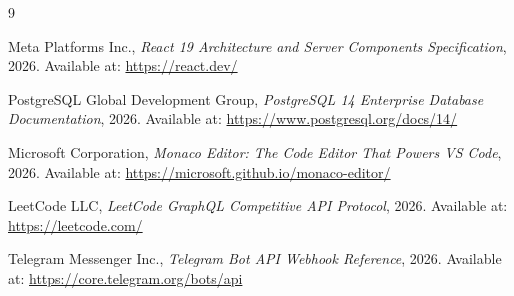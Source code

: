 \documentclass[12pt,a4paper]{report}
\begin{document}
\cleardoublepage
\begin{thebibliography}{9}

Meta Platforms Inc., \textit{React 19 Architecture and Server Components Specification}, 2026. Available at: \url{https://react.dev/}

PostgreSQL Global Development Group, \textit{PostgreSQL 14 Enterprise Database Documentation}, 2026. Available at: \url{https://www.postgresql.org/docs/14/}

Microsoft Corporation, \textit{Monaco Editor: The Code Editor That Powers VS Code}, 2026. Available at: \url{https://microsoft.github.io/monaco-editor/}

LeetCode LLC, \textit{LeetCode GraphQL Competitive API Protocol}, 2026. Available at: \url{https://leetcode.com/}

Telegram Messenger Inc., \textit{Telegram Bot API Webhook Reference}, 2026. Available at: \url{https://core.telegram.org/bots/api}

\end{thebibliography}
\end{document}
